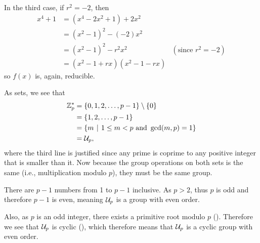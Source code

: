 \begin{questions}
\begin{partquestions}{\alph*}
\begin{partquestions}{\roman*}
\begin{partquestions}{\alph*}
                \item In the third case, if $r^2 = -2$, then
                \begin{align*}
                    x^4 + 1 &= (x^4 - 2x^2 +1) + 2x^2\\
                    &= (x^2-1)^2 - (-2)x^2\\
                    &= (x^2-1)^2 - r^2x^2 & (\text{since } r^2 = -2)\\
                    &= (x^2-1+rx)(x^2-1-rx)
                \end{align*}
                so $f(x)$ is, again, reducible.
            \end{partquestions}

            \item As sets, we see that
            \begin{align*}
                \Z_p^\ast &= \{0, 1, 2, \dots, p-1\} \setminus \{0\}\\
                &= \{1, 2, \dots, p-1\}\\
                &= \left\{m \vert 1 \leq m < p \text{ and } \gcd(m,p) = 1\right\}\\
                &= \Un{p},
            \end{align*}
            where the third line is justified since any prime is coprime to any positive integer that is smaller than it. Now because the group operations on both sets is the same (i.e., multiplication modulo $p$), they must be the same group.

            \item There are $p - 1$ numbers from 1 to $p - 1$ inclusive. As $p > 2$, thus $p$ is odd and therefore $p - 1$ is even, meaning $\mathcal{U}_{p}$ is a group with even order.

            Also, as $p$ is an odd integer, there exists a primitive root modulo $p$ (). Therefore we see that $\mathcal{U}_{p}$ is cyclic (), which therefore means that $\mathcal{U}_{p}$ is a cyclic group with even order.


\end{partquestions}
\end{partquestions}
\end{questions}
